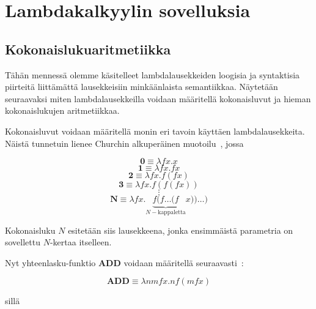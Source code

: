 \section{Lambdakalkyylin sovelluksia}

\subsection{Kokonaislukuaritmetiikka}
Tähän mennessä olemme käsitelleet lambdalausekkeiden loogisia ja syntaktisia piirteitä liittämättä lausekkeisiin minkäänlaista semantiikkaa. Näytetään seuraavaksi miten lambdalausekkeilla voidaan määritellä kokonaisluvut ja hieman kokonaislukujen aritmetiikkaa.
   
\begin{esim}
Kokonaisluvut voidaan määritellä monin eri tavoin käyttäen lambdalausekkeita. Näistä tunnetuin lienee Churchin alkuperäinen muotoilu~\cite[s.~20]{Sel2013}, jossa

\[ \textbf{0} \equiv \lambda fx . x \]
\[ \textbf{1} \equiv \lambda fx . fx \]
\[ \textbf{2} \equiv \lambda fx . f (fx) \] 
\[ \textbf{3} \equiv \lambda fx . f(f(fx)) \]
\[ \vdots \]
\[ \textbf{N} \equiv \lambda fx . \underbrace{ f ( f \ldots (f }_{ N-\text{kappaletta}} x)) \ldots ) \]
 
Kokonaisluku $N$ esitetään siis lausekkeena, jonka ensimmäistä parametria on sovellettu $N$-kertaa itselleen.

\par

Nyt yhteenlasku-funktio  \textbf{ADD} voidaan määritellä seuraavasti~\cite[s.~20]{Sel2013}:

\[ \textbf{ADD} \equiv \lambda nmfx . n f (m f x) \] 

sillä 



\end{esim}

